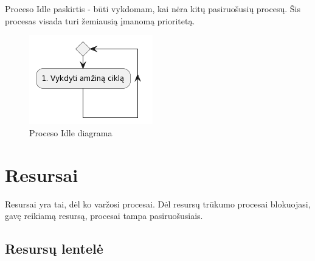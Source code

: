 \documentclass{VUMIFInfKursinis}
\begin{document}
Proceso Idle paskirtis - būti vykdomam, kai nėra kitų pasiruošusių procesų. Šis procesas visada turi žemiausią įmanomą prioritetą.

\begin{figure}[H]
	\centering	
	\includegraphics[scale=0.65]{img/Idle}
	\caption{Proceso Idle diagrama}   %
	\label{img:Idle}
\end{figure}


\section{Resursai}

Resursai yra tai, dėl ko varžosi procesai. Dėl resursų trūkumo procesai blokuojasi, gavę reikiamą resursą, procesai tampa pasiruošusiais.

\subsection{Resursų lentelė}
\end{document}
